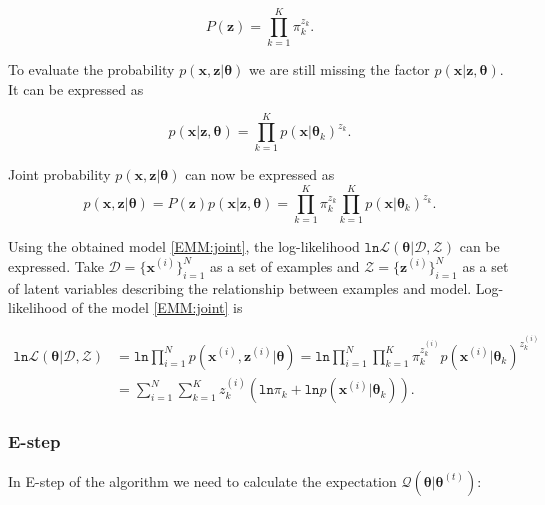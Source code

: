 \begin{equation}
	P(\mathbf{z}) = \prod_{k=1}^K\pi_k^{z_k}.
\end{equation}

To evaluate the probability $p(\mathbf{x}, \mathbf{z} | \boldsymbol \theta)$ we are still missing the factor $p(\mathbf{x}| \mathbf{z}, \boldsymbol \theta)$. It can be expressed as 

\begin{equation}
	p(\mathbf{x}| \mathbf{z}, \boldsymbol \theta) = \prod_{k=1}^{K}p(\mathbf{x}| \boldsymbol \theta_k)^{z_k}.
\end{equation}

Joint probability $p(\mathbf{x}, \mathbf{z} | \boldsymbol \theta)$ can now be expressed as 
\begin{equation}
	p(\mathbf{x}, \mathbf{z} | \boldsymbol \theta) = P(\mathbf{z})p(\mathbf{x}| \mathbf{z}, \boldsymbol \theta) = \prod_{k=1}^K\pi_{k}^{z_k}\prod_{k=1}^Kp(\mathbf{x}| \boldsymbol \theta_k)^{z_k}.
	\label{EMM:joint}
\end{equation}

Using the obtained model \ref{EMM:joint}, the log-likelihood $\mathtt{ln}\mathcal{L}(\boldsymbol \theta | \mathcal{D}, \mathcal{Z})$ can be expressed. Take $\mathcal{D} = \{ \mathbf{x}^(i) \}_{i=1}^N$ as a set of examples and $\mathcal{Z} = \{ \mathbf{z}^{(i)} \}_{i=1}^N$ as a set of latent variables describing the relationship between examples and model. Log-likelihood of the model \ref{EMM:joint} is 

\begin{equation}
\begin{split}
	\mathtt{ln}\mathcal{L}(\boldsymbol \theta | \mathcal{D}, \mathcal{Z}) &= \mathtt{ln}\prod_{i=1}^N p(\mathbf{x}^{(i)}, \mathbf{z}^{(i)} | \boldsymbol \theta) = \mathtt{ln}\prod_{i=1}^N\prod_{k=1}^K \pi_k^{z_k^{(i)}}p(\mathbf{x}^{(i)} | \boldsymbol \theta_k)^{z_k^{(i)}} \\
	&= \sum_{i=1}^N \sum_{k=1}^Kz_k^{(i)} \left ( \mathtt{ln}\pi_k + \mathtt{ln}p(\mathbf{x}^{(i)} | \boldsymbol \theta_k)  \right ).
\end{split}
\end{equation}

\subsubsection{E-step}

In E-step of the algorithm we need to calculate the expectation $\mathcal{Q}(\boldsymbol \theta | \boldsymbol \theta^{(t)})$:

